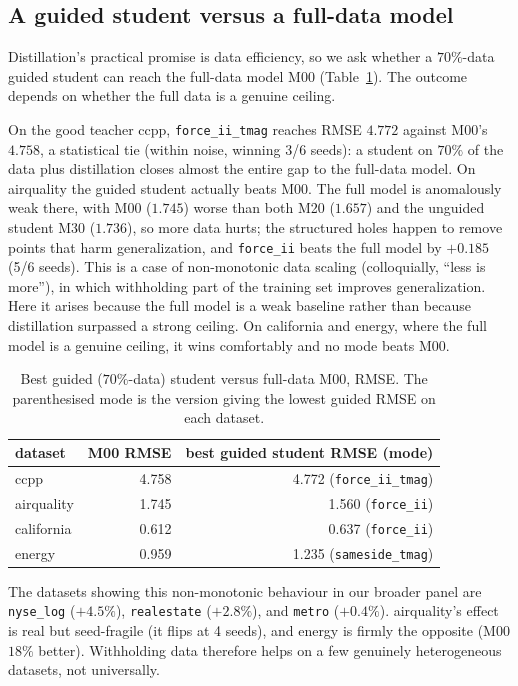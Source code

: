 \subsection{A guided student versus a full-data model}
\label{sec:full_data}

Distillation's practical promise is data efficiency, so we ask whether a $70\%$-data guided
student can reach the full-data model M00 (Table~\ref{tab:m00}). The outcome depends on
whether the full data is a genuine ceiling.

On the good teacher ccpp, \texttt{force\_ii\_tmag} reaches RMSE $4.772$ against M00's
$4.758$, a statistical tie (within noise, winning 3/6 seeds): a student on $70\%$ of the
data plus distillation closes almost the entire gap to the full-data model. On airquality
the guided student actually beats M00. The full model is anomalously weak there, with M00
($1.745$) worse than both M20 ($1.657$) and the unguided student M30 ($1.736$), so more
data hurts; the structured holes happen to remove points that harm generalization, and
\texttt{force\_ii} beats the full model by $+0.185$ (5/6 seeds). This is a case of
non-monotonic data scaling (colloquially, ``less is more''), in which withholding part of
the training set improves generalization. Here it arises because the full model is a weak
baseline rather than because distillation surpassed a strong ceiling. On california and
energy, where the full model is a genuine ceiling, it wins comfortably and no mode beats
M00.

\begin{table}[t]
\centering
\caption{Best guided ($70\%$-data) student versus full-data M00, RMSE. The parenthesised
mode is the version giving the lowest guided RMSE on each dataset.}
\label{tab:m00}
\begin{tabular}{lrr}
\toprule
dataset & M00 RMSE & best guided student RMSE (mode) \\
\midrule
ccpp       & 4.758 & 4.772 \; (\texttt{force\_ii\_tmag}) \\
airquality & 1.745 & 1.560 \; (\texttt{force\_ii}) \\
california & 0.612 & 0.637 \; (\texttt{force\_ii}) \\
energy     & 0.959 & 1.235 \; (\texttt{sameside\_tmag}) \\
\bottomrule
\end{tabular}
\end{table}

The datasets showing this non-monotonic behaviour in our broader panel are
\texttt{nyse\_log} ($+4.5\%$), \texttt{realestate} ($+2.8\%$), and \texttt{metro}
($+0.4\%$). airquality's effect is real but seed-fragile (it flips at 4 seeds), and energy
is firmly the opposite (M00 $18\%$ better). Withholding data therefore helps on a few
genuinely heterogeneous datasets, not universally.

